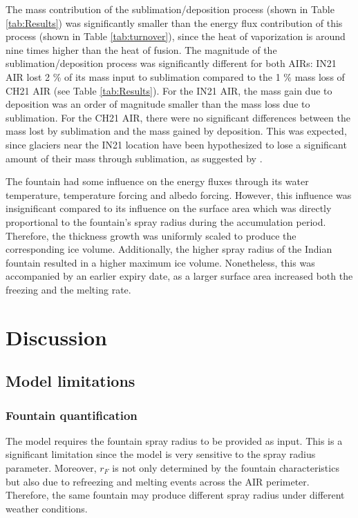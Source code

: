 \documentclass[utf8]{frontiersSCNS}
\begin{document}
The mass contribution of the sublimation/deposition process (shown in Table \ref{tab:Results}) was significantly
smaller than the energy flux contribution of this process (shown in Table \ref{tab:turnover}), since the heat of
vaporization is around nine times higher than the heat of fusion. The magnitude of the sublimation/deposition
process was significantly different for both AIRs:  IN21 AIR lost 2 \% of its mass input to sublimation
compared to the 1 \% mass loss of CH21 AIR (see Table \ref{tab:Results}). For the IN21 AIR, the mass gain due to
deposition was an order of magnitude smaller than the mass loss due to sublimation. For the CH21 AIR, there were
no significant differences between the mass lost by sublimation and the mass gained by deposition. This was
expected, since glaciers near the IN21 location have been hypothesized to lose a significant amount of their
mass through sublimation, as suggested by \cite{azam_2018}.

The fountain had some influence on the energy fluxes through its water temperature, temperature forcing and
albedo forcing. However, this influence was insignificant compared to its influence on the surface area which
was directly proportional to the fountain's spray radius during the accumulation period. Therefore, the
thickness growth was uniformly scaled to produce the corresponding ice volume. Additionally, the higher spray
radius of the Indian fountain resulted in a higher maximum ice volume. Nonetheless, this was accompanied by an
earlier expiry date, as a larger surface area increased both the freezing and the melting rate.

\section{Discussion}

\subsection{Model limitations}
\subsubsection{Fountain quantification}

The model requires the fountain spray radius to be provided as input. This is a significant limitation
since the model is very sensitive to the spray radius parameter. Moreover, $r_F$ is not only determined by the
fountain characteristics but also due to refreezing and melting events across the AIR perimeter. Therefore, the
same fountain may produce different spray radius under different weather conditions.
\end{document}
